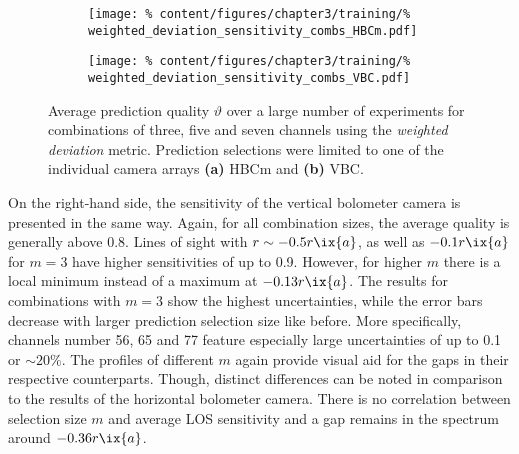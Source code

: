 %
                \begin{figure}[t]%
                    \centering%
                    \begin{subfigure}{0.47\textwidth}%
                        \texttt{[image: \%
                            content/figures/chapter3/training/\%
                            weighted\_deviation\_sensitivity\_combs\_HBCm.pdf]}%
                        \caption{}%
                    \end{subfigure}%
                    \hfill%
                    \begin{subfigure}{0.47\textwidth}%
                        \texttt{[image: \%
                            content/figures/chapter3/training/\%
                            weighted\_deviation\_sensitivity\_combs\_VBC.pdf]}%
                        \caption{}%
                    \end{subfigure}%
                    \caption{Average prediction quality $\vartheta$ over a large number of experiments for combinations of three, five and seven channels using the \textit{weighted deviation} metric. Prediction selections were limited to one of the individual camera arrays \textbf{(a)} HBCm and \textbf{(b)} VBC.}\label{fig:results_weighted_deviation}%
                \end{figure}%
%
                On the right-hand side, the sensitivity of the vertical bolometer camera is presented in the same way. Again, for all combination sizes, the average quality is generally above 0.8. Lines of sight with $r\sim-0.5r\ix{a}$, as well as $-0.1r\ix{a}$ for $m=3$ have higher sensitivities of up to 0.9. However, for higher $m$ there is a local minimum instead of a maximum at $-0.13r\ix{a}$. The results for combinations with $m=3$ show the highest uncertainties, while the error bars decrease with larger prediction selection size like before. More specifically, channels number 56, 65 and 77 feature especially large uncertainties of up to 0.1 or $\sim20\%$. The profiles of different $m$ again provide visual aid for the gaps in their respective counterparts. Though, distinct differences can be noted in comparison to the results of the horizontal bolometer camera. There is no correlation between selection size $m$ and average LOS sensitivity and a gap remains in the spectrum  around $-0.36r\ix{a}$.\\%
